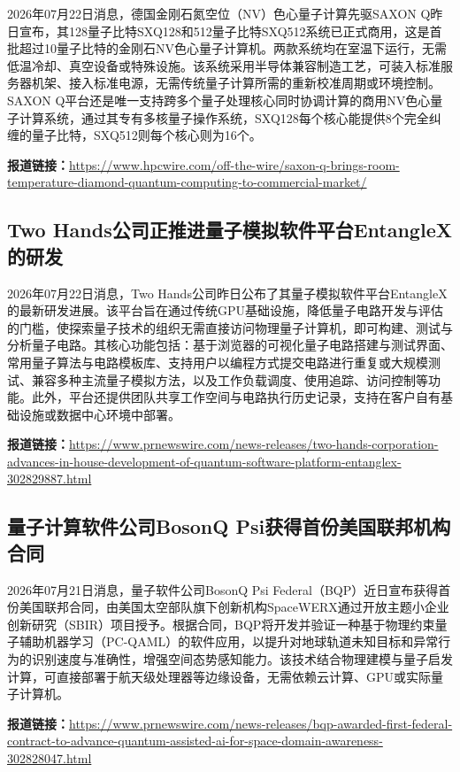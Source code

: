 \documentclass[12pt,a4paper]{ctexart}
\begin{document}
2026年07月22日消息，德国金刚石氮空位（NV）色心量子计算先驱SAXON Q昨日宣布，其128量子比特SXQ128和512量子比特SXQ512系统已正式商用，这是首批超过10量子比特的金刚石NV色心量子计算机。两款系统均在室温下运行，无需低温冷却、真空设备或特殊设施。该系统采用半导体兼容制造工艺，可装入标准服务器机架、接入标准电源，无需传统量子计算所需的重新校准周期或环境控制。SAXON Q平台还是唯一支持跨多个量子处理核心同时协调计算的商用NV色心量子计算系统，通过其专有多核量子操作系统，SXQ128每个核心能提供8个完全纠缠的量子比特，SXQ512则每个核心则为16个。

\noindent\textbf{报道链接：}\url{https://www.hpcwire.com/off-the-wire/saxon-q-brings-room-temperature-diamond-quantum-computing-to-commercial-market/}

\subsection{ Two Hands公司正推进量子模拟软件平台EntangleX的研发 }

2026年07月22日消息，Two Hands公司昨日公布了其量子模拟软件平台EntangleX的最新研发进展。该平台旨在通过传统GPU基础设施，降低量子电路开发与评估的门槛，使探索量子技术的组织无需直接访问物理量子计算机，即可构建、测试与分析量子电路。其核心功能包括：基于浏览器的可视化量子电路搭建与测试界面、常用量子算法与电路模板库、支持用户以编程方式提交电路进行重复或大规模测试、兼容多种主流量子模拟方法，以及工作负载调度、使用追踪、访问控制等功能。此外，平台还提供团队共享工作空间与电路执行历史记录，支持在客户自有基础设施或数据中心环境中部署。

\noindent\textbf{报道链接：}\url{https://www.prnewswire.com/news-releases/two-hands-corporation-advances-in-house-development-of-quantum-software-platform-entanglex-302829887.html}

\subsection{ 量子计算软件公司BosonQ Psi获得首份美国联邦机构合同 }

2026年07月21日消息，量子软件公司BosonQ Psi Federal（BQP）近日宣布获得首份美国联邦合同，由美国太空部队旗下创新机构SpaceWERX通过开放主题小企业创新研究（SBIR）项目授予。根据合同，BQP将开发并验证一种基于物理约束量子辅助机器学习（PC-QAML）的软件应用，以提升对地球轨道未知目标和异常行为的识别速度与准确性，增强空间态势感知能力。该技术结合物理建模与量子启发计算，可直接部署于航天级处理器等边缘设备，无需依赖云计算、GPU或实际量子计算机。

\noindent\textbf{报道链接：}\url{https://www.prnewswire.com/news-releases/bqp-awarded-first-federal-contract-to-advance-quantum-assisted-ai-for-space-domain-awareness-302828047.html}
\end{document}
